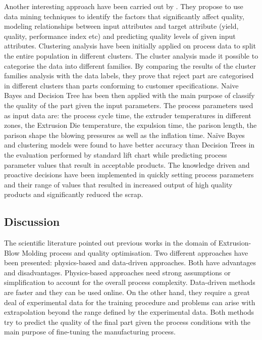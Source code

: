 Another interesting approach have been carried out by \citep{ramana2013data}. They propose to use data mining techniques to identify the factors that significantly affect quality, modeling relationships between input attributes and target attribute (yield, quality, performance index etc) and predicting quality levels of given input attributes. Clustering analysis have been initially applied on process data to split the entire population in different clusters. The cluster analysis made it possible to categorise the data into different families. By comparing the results of the cluster families analysis with the data labels, they prove that reject part are categorised in different clusters than parts conforming to customer specifications. Naive Bayes and Decision Tree has been then applied with the main purpose of classify the quality of the part given the input parameters. The process parameters used as input data are: the process cycle time, the extruder temperatures in different zones, the Extrusion Die temperature, the expulsion time, the parison length, the parison shape the blowing pressures as well as the inflation time. Naïve Bayes and clustering models were found to have better accuracy than Decision Trees in the evaluation performed by standard lift chart while predicting process parameter values that result in acceptable products. The knowledge driven and proactive decisions have been implemented in quickly setting process parameters and their range of values that resulted in increased output of high quality products and significantly reduced the scrap.

\subsection{Discussion} \label{Discussion}

The scientific literature pointed out previous works in the domain of Extrusion-Blow Molding process and quality optimisation. Two different approaches have been presented: physics-based and data-driven approaches. Both have advantages and disadvantages. Physics-based approaches need strong assumptions or simplification to account for the overall process complexity. Data-driven methods are faster and they can be used online. On the other hand, they require a great deal of experimental data for the training procedure and problems can arise with extrapolation beyond the range defined by the experimental data. Both methods try to predict the quality of the final part given the process conditions with the main purpose of fine-tuning the manufacturing process. 

